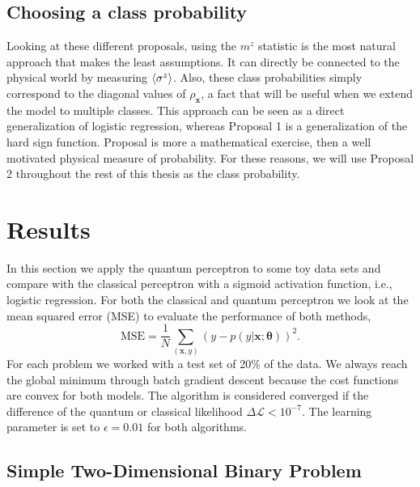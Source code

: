 \subsection{Choosing a class probability}

Looking at these different proposals, using the $m^z$ statistic is the most natural approach that makes the least assumptions. It can directly be connected to the physical world by measuring $\expval{\sigma^z}$. Also, these class probabilities simply correspond to the diagonal values of $\rho_\mathbf{x}$, a fact that will be useful when we extend the model to multiple classes. This approach can be seen as a direct generalization of logistic regression, whereas Proposal 1 is a generalization of the hard sign function. Proposal is more a mathematical exercise, then a well motivated physical measure of probability. For these reasons, we will use Proposal 2 throughout the rest of this thesis as the class probability.

\section{Results}\label{sec:results}

In this section we apply the quantum perceptron to some toy data sets and compare with the classical perceptron with a sigmoid activation function, i.e., logistic regression. For both the classical and quantum perceptron we look at the mean squared error (MSE) to evaluate the performance of both methods,
\begin{equation*}
    \text{MSE} = \frac{1}{N}\sum_{(\mathbf{x},y)} \left(y - p(y|\mathbf{x};\bm{\theta})\right)^2.
\end{equation*}
For each problem we worked with a test set of 20\% of the data. We always reach the global minimum through batch gradient descent because the cost functions are convex for both models. The algorithm is considered converged if the difference of the quantum or classical likelihood $\Delta \mathcal{L} <10^{-7}$. The learning parameter is set to $\epsilon=0.01$ for both algorithms.

\subsection {Simple Two-Dimensional Binary Problem}

